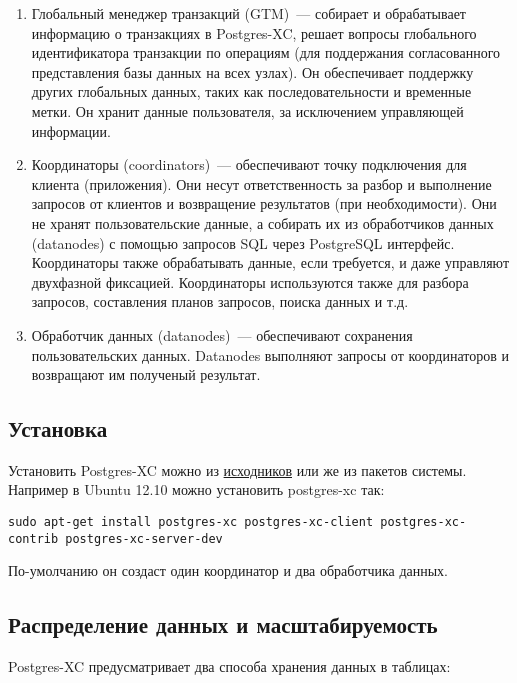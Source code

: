 \begin{enumerate}
\item Глобальный менеджер транзакций (GTM)~--- собирает и обрабатывает информацию о транзакциях в Postgres-XC, решает вопросы глобального идентификатора транзакции по операциям (для поддержания согласованного представления базы данных на всех узлах). Он обеспечивает поддержку других глобальных данных, таких как последовательности и временные метки. Он хранит данные пользователя, за исключением управляющей информации.
\item Координаторы (coordinators)~--- обеспечивают точку подключения для клиента (приложения). Они несут ответственность за разбор и выполнение запросов от клиентов и возвращение результатов (при необходимости). Они не хранят пользовательские данные, а собирать их из обработчиков данных (datanodes) с помощью запросов SQL через PostgreSQL интерфейс. Координаторы также обрабатывать данные, если требуется, и даже управляют двухфазной фиксацией. Координаторы используются также для разбора запросов, составления планов запросов, поиска данных и т.д.
\item Обработчик данных (datanodes)~--- обеспечивают сохранения пользовательских данных. Datanodes выполняют запросы от координаторов и возвращают им полученый результат.
\end{enumerate}

\subsection{Установка}

Установить Postgres-XC можно из \href{http://postgres-xc.sourceforge.net/docs/1_0/install-short.html}{исходников} или же из пакетов системы. Например в Ubuntu 12.10 можно установить postgres-xc так:

\begin{lstlisting}[label=lst:postgres-xc1,caption=Установка Postgres-XC]
sudo apt-get install postgres-xc postgres-xc-client postgres-xc-contrib postgres-xc-server-dev
\end{lstlisting}

По-умолчанию он создаст один координатор и два обработчика данных.

\subsection{Распределение данных и масштабируемость}

Postgres-XC предусматривает два способа хранения данных в таблицах:

